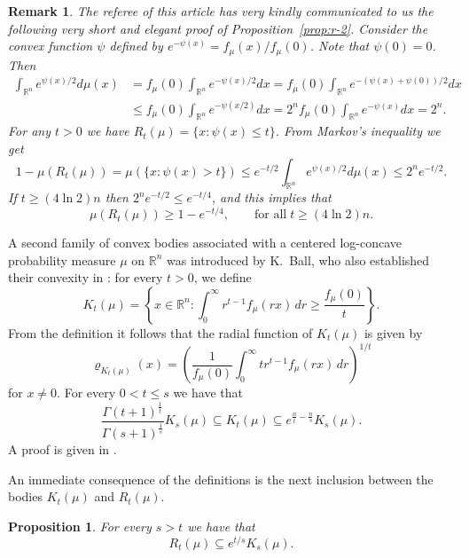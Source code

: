 \documentclass[11pt,leqno]{article}
\newtheorem{proposition}[theorem]{Proposition}
\newtheorem{remark}[theorem]{Remark}
\theoremstyle{definition}
\theoremstyle{remark}
\numberwithin{equation}{section}
\newcommand{\ls}{\leqslant}
\newcommand{\gr}{\geqslant}
\newcommand{\1}{\textbf{1}}
\begin{document}
\begin{remark}\label{rem:referee}\rm The referee of this article has very kindly communicated to us the following very short and elegant proof
of Proposition~\ref{prop:r-2}. Consider the convex function $\psi$ defined by $e^{-\psi(x)}=f_{\mu}(x)/f_{\mu}(0)$. Note that $\psi(0)=0$.
Then
\begin{align*}
\int_{\mathbb{R}^n}e^{\psi(x)/2}d\mu(x) &=f_{\mu}(0)\int_{\mathbb{R}^n}e^{-\psi(x)/2}dx=f_{\mu}(0)\int_{\mathbb{R}^n}e^{-(\psi(x)+\psi(0))/2}dx\\
&\ls f_{\mu}(0)\int_{\mathbb{R}^n}e^{-\psi(x/2)}dx=2^nf_{\mu}(0)\int_{\mathbb{R}^n}e^{-\psi(x)}dx=2^n.
\end{align*}
For any $t>0$ we have $R_t(\mu)=\{x:\psi(x)\ls t\}$. From Markov's inequality we get
$$1-\mu(R_t(\mu))=\mu(\{x:\psi(x)>t\})\ls e^{-t/2}\int_{\mathbb{R}^n}e^{\psi(x)/2}d\mu(x)\ls 2^ne^{-t/2}.$$
If $t\gr (4\ln 2)n$ then $2^ne^{-t/2}\ls e^{-t/4}$, and this implies that
$$\mu(R_t(\mu))\gr 1-e^{-t/4},\qquad\text{for all}\;t\gr (4\ln 2)n.$$
\end{remark} 

A second family of convex bodies associated with a centered log-concave probability measure $\mu$ on
$\mathbb{R}^n$ was introduced by K.~Ball, who also established their convexity in \cite{Ball-1988}: for every $t>0$, we define
\begin{equation*}
K_t(\mu)=\left\{x\in {\mathbb R}^n : \int_0^\infty r^{t-1}f_\mu(rx)\,
dr\gr \frac{f_{\mu }(0)}{t} \right\}.
\end{equation*}
From the definition it follows that the radial function of $K_t(\mu )$ is given by
\begin{equation}\label{eq:radial-Kp}
\varrho_{K_t(\mu )}(x)=\left (\frac{1}{f_{\mu }(0)}\int_0^{\infty}tr^{t-1}f_{\mu }(rx)\,dr\right )^{1/t}\end{equation}
for $x\neq 0$. For every $0 <t\ls s$ we have that
\begin{equation}\label{eq:inclusions-Kp}\frac{\Gamma(t+1)^{\frac{1}{t}}}{\Gamma(s+1)^{\frac{1}{s}}} K_s(\mu )\subseteq
K_{t}(\mu )\subseteq e^{\frac{n}{t}-\frac{n}{s}}K_{s}(\mu ).
\end{equation} A proof is given in \cite[Proposition~2.5.7]{BGVV-book}.

An immediate consequence of the definitions is the next inclusion between the bodies $K_t(\mu)$ and $R_t(\mu)$.

\begin{proposition}\label{prop:r-3}For every $s>t$ we have that
$$R_t(\mu )\subseteq e^{t/s}K_s(\mu ).$$
\end{proposition}
\end{document}
